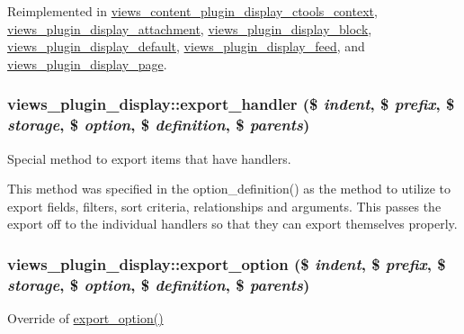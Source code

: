Reimplemented in \hyperlink{classviews__content__plugin__display__ctools__context_a45d28ca00a2dc732cf72be0ea0318895}{views\_\-content\_\-plugin\_\-display\_\-ctools\_\-context}, \hyperlink{classviews__plugin__display__attachment_a5ca7a4fec7907cd236d0f73ac21f4e1e}{views\_\-plugin\_\-display\_\-attachment}, \hyperlink{classviews__plugin__display__block_ad673f5b3462304a522ead4293a8f7cef}{views\_\-plugin\_\-display\_\-block}, \hyperlink{classviews__plugin__display__default_acceee9203c7f628f686147944442fecd}{views\_\-plugin\_\-display\_\-default}, \hyperlink{classviews__plugin__display__feed_a6bfa566313f3f8fba85751554567e2dd}{views\_\-plugin\_\-display\_\-feed}, and \hyperlink{classviews__plugin__display__page_a943b71fc873e5d09f548b69ba314b674}{views\_\-plugin\_\-display\_\-page}.\hypertarget{classviews__plugin__display_ae74383fcfdbc53ba6559e2d2f437bde1}{
\subsubsection[{export\_\-handler}]{\setlength{\rightskip}{0pt plus 5cm}views\_\-plugin\_\-display::export\_\-handler (\$ {\em indent}, \/  \$ {\em prefix}, \/  \$ {\em storage}, \/  \$ {\em option}, \/  \$ {\em definition}, \/  \$ {\em parents})}}
\label{classviews__plugin__display_ae74383fcfdbc53ba6559e2d2f437bde1}
Special method to export items that have handlers.

This method was specified in the option\_\-definition() as the method to utilize to export fields, filters, sort criteria, relationships and arguments. This passes the export off to the individual handlers so that they can export themselves properly. \hypertarget{classviews__plugin__display_a69299ab50ce926752aa185d5120e35b0}{
\subsubsection[{export\_\-option}]{\setlength{\rightskip}{0pt plus 5cm}views\_\-plugin\_\-display::export\_\-option (\$ {\em indent}, \/  \$ {\em prefix}, \/  \$ {\em storage}, \/  \$ {\em option}, \/  \$ {\em definition}, \/  \$ {\em parents})}}
\label{classviews__plugin__display_a69299ab50ce926752aa185d5120e35b0}
Override of \hyperlink{classviews__plugin__display_a69299ab50ce926752aa185d5120e35b0}{export\_\-option()}

